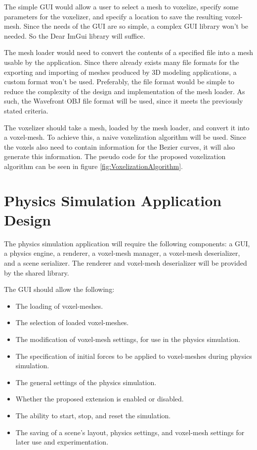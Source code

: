 The simple GUI would allow a user to select a mesh to voxelize, specify some parameters for the 
voxelizer, and specify a location to save the resulting voxel-mesh. Since the needs of the GUI are 
so simple, a complex GUI library won't be needed. So the Dear ImGui library will suffice.

The mesh loader would need to convert the contents of a specified file into a mesh usable by the
application. Since there already exists many file formats for the exporting and importing of meshes
produced by 3D modeling applications, a custom format won't be used. Preferably, the file format 
would be simple to reduce the complexity of the design and implementation of the mesh loader. As
such, the Wavefront OBJ file format will be used, since it meets the previously stated criteria.

The voxelizer should take a mesh, loaded by the mesh loader, and convert it into a voxel-mesh. To
achieve this, a naive voxelization algorithm will be used. Since the voxels also need to contain
information for the Bezier curves, it will also generate this information. The pseudo code for the 
proposed voxelization algorithm can be seen in figure \ref{fig:VoxelizationAlgorithm}.



\section{Physics Simulation Application Design}

The physics simulation application will require the following components: a GUI, a physics 
engine, a renderer, a voxel-mesh manager, a voxel-mesh deserializer, and a scene serializer. The 
renderer and voxel-mesh deserializer will be provided by the shared library.

The GUI should allow the following:

\begin{itemize}
  \item The loading of voxel-meshes.
  \item The selection of loaded voxel-meshes.
  \item The modification of voxel-mesh settings, for use in the physics simulation.
  \item The specification of initial forces to be applied to voxel-meshes during physics simulation.
  \item The general settings of the physics simulation.
  \item Whether the proposed extension is enabled or disabled.
  \item The ability to start, stop, and reset the simulation.
  \item The saving of a scene's layout, physics settings, and voxel-mesh settings for later use and
  experimentation.
\end{itemize}

